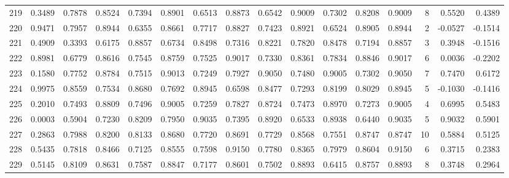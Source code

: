 \begin{tabular}{lrrrrrrrrrrrrrrr}
219 &      0.3489 &  0.7878 &  0.8524 &  0.7394 &  0.8901 &  0.6513 &  0.8873 &  0.6542 &  0.9009 &  0.7302 &   0.8208 &     0.9009 &      8 &                    0.5520 &                     0.4389 \\
220 &      0.9471 &  0.7957 &  0.8944 &  0.6355 &  0.8661 &  0.7717 &  0.8827 &  0.7423 &  0.8921 &  0.6524 &   0.8905 &     0.8944 &      2 &                   -0.0527 &                    -0.1514 \\
221 &      0.4909 &  0.3393 &  0.6175 &  0.8857 &  0.6734 &  0.8498 &  0.7316 &  0.8221 &  0.7820 &  0.8478 &   0.7194 &     0.8857 &      3 &                    0.3948 &                    -0.1516 \\
222 &      0.8981 &  0.6779 &  0.8616 &  0.7545 &  0.8759 &  0.7525 &  0.9017 &  0.7330 &  0.8361 &  0.7834 &   0.8846 &     0.9017 &      6 &                    0.0036 &                    -0.2202 \\
223 &      0.1580 &  0.7752 &  0.8784 &  0.7515 &  0.9013 &  0.7249 &  0.7927 &  0.9050 &  0.7480 &  0.9005 &   0.7302 &     0.9050 &      7 &                    0.7470 &                     0.6172 \\
224 &      0.9975 &  0.8559 &  0.7534 &  0.8680 &  0.7692 &  0.8945 &  0.6598 &  0.8477 &  0.7293 &  0.8199 &   0.8029 &     0.8945 &      5 &                   -0.1030 &                    -0.1416 \\
225 &      0.2010 &  0.7493 &  0.8809 &  0.7496 &  0.9005 &  0.7259 &  0.7827 &  0.8724 &  0.7473 &  0.8970 &   0.7273 &     0.9005 &      4 &                    0.6995 &                     0.5483 \\
226 &      0.0003 &  0.5904 &  0.7230 &  0.8209 &  0.7950 &  0.9035 &  0.7395 &  0.8920 &  0.6533 &  0.8938 &   0.6440 &     0.9035 &      5 &                    0.9032 &                     0.5901 \\
227 &      0.2863 &  0.7988 &  0.8200 &  0.8133 &  0.8680 &  0.7720 &  0.8691 &  0.7729 &  0.8568 &  0.7551 &   0.8747 &     0.8747 &     10 &                    0.5884 &                     0.5125 \\
228 &      0.5435 &  0.7818 &  0.8466 &  0.7125 &  0.8555 &  0.7598 &  0.9150 &  0.7780 &  0.8365 &  0.7979 &   0.8604 &     0.9150 &      6 &                    0.3715 &                     0.2383 \\
229 &      0.5145 &  0.8109 &  0.8631 &  0.7587 &  0.8847 &  0.7177 &  0.8601 &  0.7502 &  0.8893 &  0.6415 &   0.8757 &     0.8893 &      8 &                    0.3748 &                     0.2964 \\

\end{tabular}
